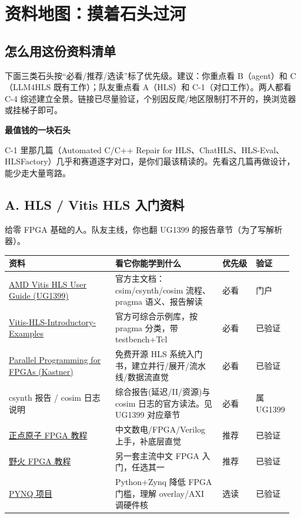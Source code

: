 \documentclass[12pt,a4paper]{ctexbook}
\begin{document}
\chapter{资料地图：摸着石头过河}

\section{怎么用这份资料清单}

下面三类石头按“必看/推荐/选读”标了优先级。建议：你重点看 B（agent）和 C（LLM4HLS 既有工作）；队友重点看 A（HLS）和 C-1（对口工作）。两人都看 C-4 综述建立全景。链接已尽量验证，个别因反爬/地区限制打不开的，换浏览器或挂梯子即可。

\begin{tipbox}
\textbf{最值钱的一块石头}\par
C-1 里那几篇（Automated C/C++ Repair for HLS、ChatHLS、HLS-Eval、HLSFactory）几乎和赛道逐字对口，是你们最该精读的。先看这几篇再做设计，能少走大量弯路。
\end{tipbox}

\section{A. HLS / Vitis HLS 入门资料}

给零 FPGA 基础的人。队友主线，你也翻 UG1399 的报告章节（为了写解析器）。

{\small
\begin{longtable}{@{}L{0.38\linewidth}L{0.38\linewidth}L{0.12\linewidth}L{0.08\linewidth}@{}}
\toprule
\textbf{资料} & \textbf{看它你能学到什么} & \textbf{优先级} & \textbf{验证} \\
\midrule
\endhead
\href{https://docs.amd.com/r/en-US/ug1399-vitis-hls}{AMD Vitis HLS User Guide (UG1399)} & 官方主文档：csim/csynth/cosim 流程、pragma 语义、报告解读 & 必看 & 门户 \\
\href{https://github.com/Xilinx/Vitis-HLS-Introductory-Examples}{Vitis-HLS-Introductory-Examples} & 官方可综合示例库，按 pragma 分类，带 testbench+Tcl & 必看 & 已验证 \\
\href{https://kastner.ucsd.edu/hlsbook/}{Parallel Programming for FPGAs (Kastner)} & 免费开源 HLS 系统入门书，建立并行/展开/流水线/数据流直觉 & 必看 & 已验证 \\
csynth 报告 / cosim 日志说明 & 综合报告(延迟/II/资源)与 cosim 日志的官方读法。见 UG1399 对应章节 & 必看 & 属UG1399 \\
\href{http://www.openedv.com/}{正点原子 FPGA 教程} & 中文数电/FPGA/Verilog 上手，补底层直觉 & 推荐 & 已验证 \\
\href{http://www.embedfire.com/}{野火 FPGA 教程} & 另一套主流中文 FPGA 入门，任选其一 & 推荐 & 已验证 \\
\href{https://github.com/Xilinx/PYNQ}{PYNQ 项目} & Python+Zynq 降低 FPGA 门槛，理解 overlay/AXI 调硬件核 & 选读 & 已验证 \\
\bottomrule
\end{longtable}
}
\end{document}
